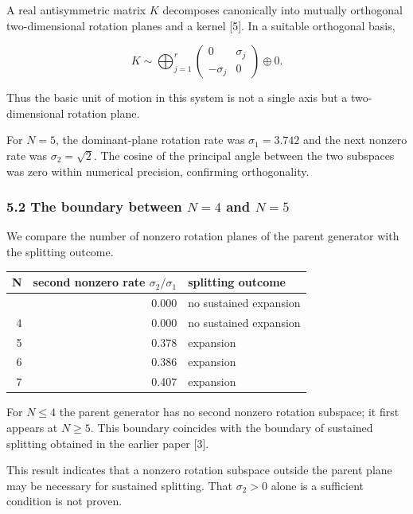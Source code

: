 \documentclass[
  a4paper,
]{article}
\newcounter{none} %
\begin{document}
A real antisymmetric matrix \(K\) decomposes canonically into mutually
orthogonal two-dimensional rotation planes and a kernel {[}5{]}. In a
suitable orthogonal basis,

\[
K
\sim
\bigoplus_{j=1}^{r}
\begin{pmatrix}
0 & \sigma_j\\
-\sigma_j & 0
\end{pmatrix}
\oplus 0.
\]

Thus the basic unit of motion in this system is not a single axis but a
two-dimensional rotation plane.

For \(N=5\), the dominant-plane rotation rate was \(\sigma_1=3.742\) and
the next nonzero rate was \(\sigma_2=\sqrt2\). The cosine of the
principal angle between the two subspaces was zero within numerical
precision, confirming orthogonality.

\subsubsection{\texorpdfstring{5.2 The boundary between \(N=4\) and
\(N=5\)}{5.2 The boundary between N=4 and N=5}}\label{the-boundary-between-n4-and-n5}

We compare the number of nonzero rotation planes of the parent generator
with the splitting outcome.

{\def\LTcaptype{none} %
\begin{longtable}[]{@{}rrl@{}}
\toprule\noalign{}
N & second nonzero rate \(\sigma_2/\sigma_1\) & splitting outcome \\
\midrule\noalign{}
\endhead
\bottomrule\noalign{}
\endlastfoot
3 & 0.000 & no sustained expansion \\
4 & 0.000 & no sustained expansion \\
5 & 0.378 & expansion \\
6 & 0.386 & expansion \\
7 & 0.407 & expansion \\
\end{longtable}
}

For \(N\le4\) the parent generator has no second nonzero rotation
subspace; it first appears at \(N\ge5\). This boundary coincides with
the boundary of sustained splitting obtained in the earlier paper
{[}3{]}.

This result indicates that a nonzero rotation subspace outside the
parent plane may be necessary for sustained splitting. That
\(\sigma_2>0\) alone is a sufficient condition is not proven.
\end{document}
